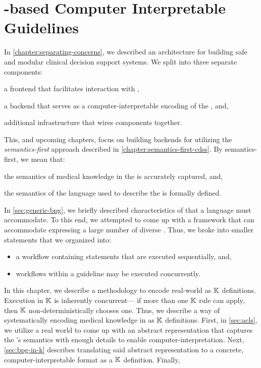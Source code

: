 \chapter{\K{}-based Computer Interpretable Guidelines}

In \autoref{chapter:separating-concerns}, we described an
architecture for building safe and modular clinical decision support systems.
We split \CDSSs{} into three separate components:
\begin{enumerate*}[label=(\alph*)]
  \item a frontend that facilitates interaction with \HCPs{},
  \item a backend that serves as a computer-interpretable encoding of the \BPG{}, and,
  \item additional infrastructure that wires components together.
\end{enumerate*}
This, and upcoming chapters, focus on building backends for \CDSSs{}
utilizing the \emph{semantics-first} approach described in
\autoref{chapter:semantics-first-cdss}. By semantics-first, we
mean that:
\begin{enumerate*}[label=(\alph*)]
 \item the semantics of medical knowledge in the \BPG{} is
 accurately captured, and,
 \item the semantics of the language used to describe the
 \BPG{} is formally defined.
\end{enumerate*}

In \autoref{sec:generic-bpg}, we briefly described characteristics
of \BPGs{} that a \CIG{} language must accommodate.
To this end, we attempted to come up with a framework that
can accommodate expressing a large number of diverse \BPGs{}.
Thus, we broke \BPGs{} into smaller statements that we organized
into:
\begin{itemize}
  \item a workflow containing statements that are executed sequentially, and,
  \item workflows within a guideline may be executed concurrently.
\end{itemize}

In this chapter, we describe a methodology to encode real-world \BPGs{}
as $\mathbb{K}$ definitions. Execution in $\mathbb{K}{}$ is inherently concurrent---
if more than one $\mathbb{K}{}$ rule can apply, then $\mathbb{K}$ non-deterministically
chooses one. Thus, we describe a way of systematically encoding
medical knowledge in \BPGs{} as $\mathbb{K}$ definitions. First, in
\autoref{sec:acls}, we utilize a real world \BPG{} to come up
with an abstract representation that captures the \BPGs{}'s semantics
with enough details to enable computer-interpretation.
Next, \autoref{sec:bpg-in-k} describes translating said abstract representation
to a concrete, computer-interpretable format as a $\mathbb{K}{}$ definition.
Finally,

